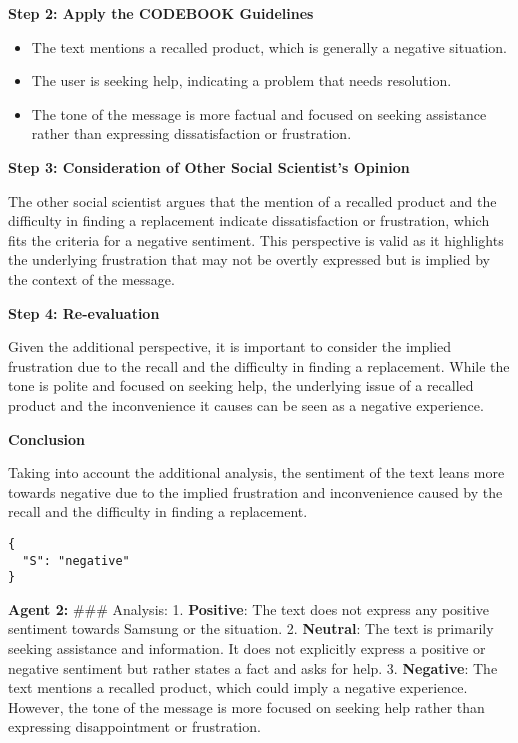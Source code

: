 \textbf{Step 2: Apply the CODEBOOK Guidelines}

\begin{itemize}
\tightlist
\item
  The text mentions a recalled product, which is generally a negative
  situation.
\item
  The user is seeking help, indicating a problem that needs resolution.
\item
  The tone of the message is more factual and focused on seeking
  assistance rather than expressing dissatisfaction or frustration.
\end{itemize}

\textbf{Step 3: Consideration of Other Social Scientist's Opinion}

The other social scientist argues that the mention of a recalled product
and the difficulty in finding a replacement indicate dissatisfaction or
frustration, which fits the criteria for a negative sentiment. This
perspective is valid as it highlights the underlying frustration that
may not be overtly expressed but is implied by the context of the
message.

\textbf{Step 4: Re-evaluation}

Given the additional perspective, it is important to consider the
implied frustration due to the recall and the difficulty in finding a
replacement. While the tone is polite and focused on seeking help, the
underlying issue of a recalled product and the inconvenience it causes
can be seen as a negative experience.

\textbf{Conclusion}

Taking into account the additional analysis, the sentiment of the text
leans more towards negative due to the implied frustration and
inconvenience caused by the recall and the difficulty in finding a
replacement.

\begin{verbatim}
{
  "S": "negative"
}
\end{verbatim}

\textbf{Agent 2:} \#\#\# Analysis: 1. \textbf{Positive}: The text does not
express any positive sentiment towards Samsung or the situation. 2.
\textbf{Neutral}: The text is primarily seeking assistance and
information. It does not explicitly express a positive or negative
sentiment but rather states a fact and asks for help. 3.
\textbf{Negative}: The text mentions a recalled product, which could
imply a negative experience. However, the tone of the message is more
focused on seeking help rather than expressing disappointment or
frustration.

